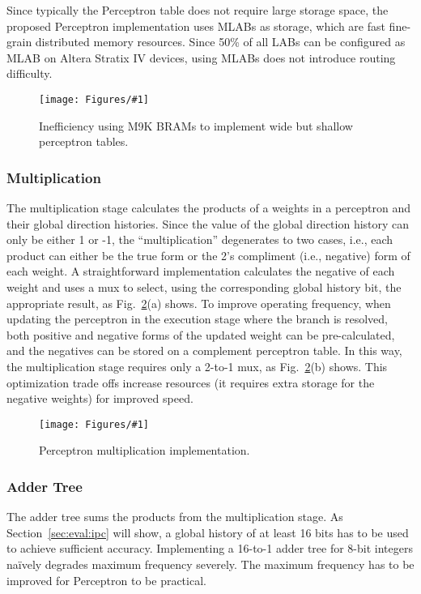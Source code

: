 \documentclass[conference]{IEEEtran}
\newcommand{\kfig}[4]{ %
        \begin{figure}[!t]
        \centering
        \texttt{[image: Figures/\#1]}
        \vspace{-1mm}
        \caption{#3}
        \label{#2}
        \end{figure}
}
\begin{document}
Since typically the Perceptron table does not require large storage space, the proposed Perceptron implementation uses MLABs as storage, which are fast fine-grain distributed memory resources. Since 50\% of all LABs can be configured as MLAB on Altera Stratix IV devices, using MLABs does not introduce routing difficulty.
\kfig{perceptronTable.pdf}{fig:perceptronTable}{Inefficiency using M9K BRAMs to implement wide but shallow perceptron tables.}{angle = 0, trim = 1in 2in 3.4in 0.6in, clip, width=0.25\textwidth}


\subsubsection{Multiplication}
\label{sec:fpga:perceptron:mult}
The multiplication stage calculates the products of a weights in a perceptron and their global direction histories. Since the value of the global direction history can only be either 1 or -1, the ``multiplication'' degenerates to two cases, i.e., each product can either be the true form or the 2's compliment (i.e., negative) form of each weight. A straightforward implementation calculates the negative of each weight and uses a mux to select, using the corresponding global history bit, the appropriate result, as Fig.~\ref{fig:perceptronMult}(a) shows. To improve operating frequency, when updating the perceptron in the execution stage where the branch is resolved, both positive and negative forms of the updated weight can be pre-calculated, and the negatives can be stored on a complement perceptron table. In this way, the multiplication stage requires only a 2-to-1 mux, as Fig.~\ref{fig:perceptronMult}(b) shows. This optimization trade offs increase resources (it requires extra storage for the negative weights) for improved speed.
\kfig{perceptronMult.pdf}{fig:perceptronMult}{Perceptron multiplication implementation.}{angle = 0, trim = 0.3in 2.2in 3in 0.6in, clip, width=0.3\textwidth}

\subsubsection{Adder Tree}
\label{sec:fpga:perceptron:adder}
The adder tree sums the products from the multiplication stage. As Section~\ref{sec:eval:ipc} will show, a global history of at least 16 bits has to be used to achieve sufficient accuracy. Implementing a 16-to-1 adder tree for 8-bit integers na\"ively degrades maximum frequency severely. The maximum frequency has to be improved for Perceptron to be practical.
\end{document}
